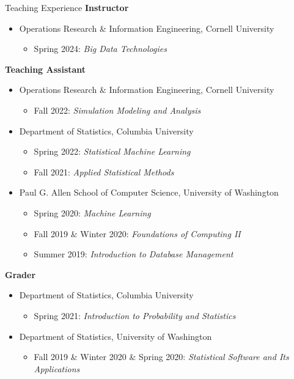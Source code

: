 \documentclass{resume} %
\begin{document}
\begin{rSection}{Teaching Experience}
{\bf Instructor}
\begin{itemize}
	\item Operations Research \& Information Engineering, Cornell University
	\begin{itemize}
		\item Spring 2024: {\em Big Data Technologies}
	\end{itemize}
\end{itemize}
{\bf Teaching Assistant}
\begin{itemize}
	\item Operations Research \& Information Engineering, Cornell University
	\begin{itemize}
		\item Fall 2022: {\em Simulation Modeling and Analysis}
	\end{itemize}
	\item Department of Statistics, Columbia University
	\begin{itemize}
		\item Spring 2022: {\em Statistical Machine Learning}
		\item Fall 2021: {\em Applied Statistical Methods}
	\end{itemize}
	\item Paul G. Allen School of Computer Science, University of Washington
	\begin{itemize}
		\item Spring 2020: {\em Machine Learning}
		\item Fall 2019 \& Winter 2020: {\em Foundations of Computing II}
		\item Summer 2019: {\em Introduction to Database Management}
	\end{itemize}
\end{itemize}
{\bf Grader}
\begin{itemize}
	\item Department of Statistics, Columbia University
	\begin{itemize}
		\item Spring 2021: {\em Introduction to Probability and Statistics}
	\end{itemize}
	\item Department of Statistics, University of Washington
	\begin{itemize}
		\item Fall 2019 \& Winter 2020 \& Spring 2020: {\em Statistical Software and Its Applications}
	\end{itemize}
\end{itemize}
\end{rSection}




\end{document}
